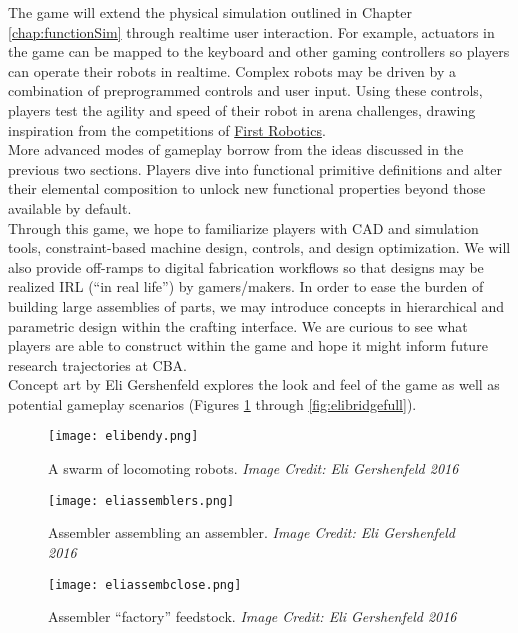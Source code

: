 {The game will extend the physical simulation outlined in Chapter \ref{chap:functionSim} through realtime user interaction.  For example, actuators in the game can be mapped to the keyboard and other gaming controllers so players can operate their robots in realtime.  Complex robots may be driven by a combination of preprogrammed controls and user input.  Using these controls, players test the agility and speed of their robot in arena challenges, drawing inspiration from the competitions of \href{http://www.firstinspires.org/robotics/frc}{First Robotics}.\\

More advanced modes of gameplay borrow from the ideas discussed in the previous two sections.  Players dive into functional primitive definitions and alter their elemental composition to unlock new functional properties beyond those available by default.\\

Through this game, we hope to familiarize players with CAD and simulation tools, constraint-based machine design, controls, and design optimization.  We will also provide off-ramps to digital fabrication workflows so that designs may be realized IRL (``in real life'') by gamers/makers.  In order to ease the burden of building large assemblies of parts, we may introduce concepts in hierarchical and parametric design within the crafting interface.  We are curious to see what players are able to construct within the game and hope it might inform future research trajectories at CBA.\\

Concept art by Eli Gershenfeld explores the look and feel of the game as well as potential gameplay scenarios (Figures \ref{fig:elibendy} through \ref{fig:elibridgefull}).

\clearpage

\begin{figure}
  \texttt{[image: elibendy.png]}
  \caption{A swarm of locomoting robots.  \textit{Image Credit: Eli Gershenfeld 2016}}
  \label{fig:elibendy}
\end{figure}

\begin{figure}
  \texttt{[image: eliassemblers.png]}
  \caption{Assembler assembling an assembler.  \textit{Image Credit: Eli Gershenfeld 2016}}
  \label{fig:eliassemblers}
\end{figure}

\begin{figure}
  \texttt{[image: eliassembclose.png]}
  \caption{Assembler ``factory'' feedstock.  \textit{Image Credit: Eli Gershenfeld 2016}}
  \label{fig:eliassembclose}
\end{figure}

}
